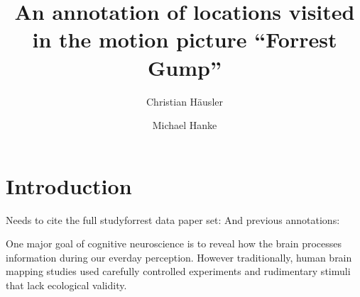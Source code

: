 \documentclass[10pt,a4paper,twocolumn]{article}
\begin{document}


\title{An annotation of locations visited in the motion picture ``Forrest Gump''}

\author[1]{Christian Häusler}
\author[1,2]{Michael Hanke}

\maketitle
\thispagestyle{fancy}

\begin{abstract}


\end{abstract}


\clearpage


\section*{Introduction}



Needs to cite the full studyforrest data paper set: \citep{HBI+14,HDH+2015,SKG+16,HAK+16}
And previous annotations: \citep{LRS+2015}

One major goal of cognitive neuroscience is to reveal how the brain
processes information during our everday perception. However traditionally,
human brain mapping studies used carefully controlled experiments
and rudimentary stimuli 
that lack ecological validity. 
\end{document}

